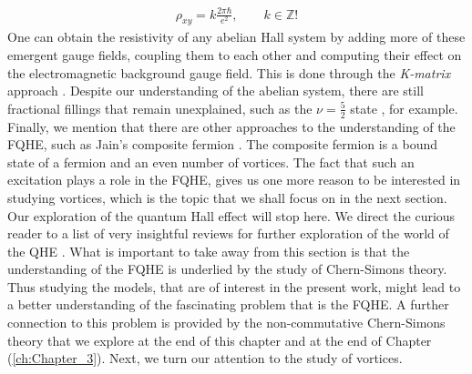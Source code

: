 \begin{align}
    \rho_{xy} =k\frac{2\pi \hbar}{e^2 }, \qquad k \in \mathbb{Z}!
\end{align}
 One can obtain the resistivity of any abelian Hall system by adding more of these emergent gauge fields, coupling them to each other and computing their effect on the electromagnetic background gauge field. This is done through the \textit{K-matrix} approach \cite{PhysRevB.46.2290}. Despite our understanding of the abelian system, there are still fractional fillings that remain unexplained, such as the $\nu=\frac{5}{2}$ state \cite{Willett:1987zz}, for example. Finally, we mention that there are other approaches to the understanding of the FQHE, such as Jain's composite fermion \cite{PhysRevLett.63.199}. The composite fermion is a bound state of a fermion and an even number of vortices. The fact that such an excitation plays a role in the FQHE, gives us one more reason to be interested in studying vortices, which is the topic that we shall focus on in the next section.\\
        \indent Our exploration of the quantum Hall effect will stop here. We direct the curious reader to a list of very insightful reviews for further exploration of the world of the QHE \cite{Wen:1995qn, Tong:2016kpv, Zee, yoshioka2002the, Girvin}. What is important to take away from this section is that the understanding of the FQHE is underlied by the study of Chern-Simons theory. Thus studying the models, that are of interest in the present work, might lead to a better understanding of the fascinating problem that is the FQHE. A further connection to this problem is provided by the non-commutative Chern-Simons theory that we explore at the end of this chapter and at the end of Chapter (\ref{ch:Chapter_3}). Next, we turn our attention to the study of vortices.

